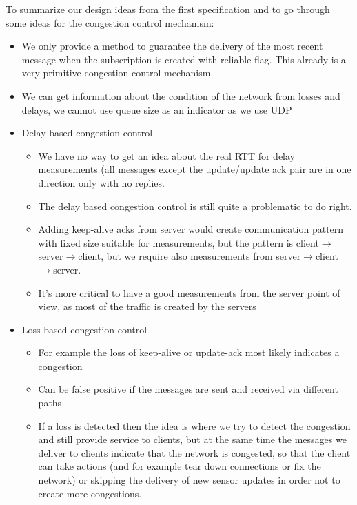 \documentclass[11pt,a4paper]{report}
\begin{document}
To summarize our design ideas from the first specification and to go through some ideas for the congestion control mechanism:
\begin{itemize}
 \item We only provide a method to guarantee the delivery of the most recent message when the subscription is created with reliable flag. This already is a very primitive congestion control mechanism.
 \item We can get information about the condition of the network from losses and delays, we cannot use queue size as an indicator as we use UDP
 \item Delay based congestion control
    \begin{itemize}
        \item We have no way to get an idea about the real RTT for delay measurements (all messages except the update/update ack pair are in one direction only with no replies.
         \item The delay based congestion control is still quite a problematic to do right. 
         \item Adding keep-alive acks from server would create communication pattern with fixed size suitable for measurements, but the pattern is client$\rightarrow$server$\rightarrow$client, but we require also measurements from server$\rightarrow$client$\rightarrow$server.
         \item It's more critical to have a good measurements from the server point of view, as most of the traffic is created by the servers
  \end{itemize}
\item Loss based congestion control
       \begin{itemize}
        \item For example the loss of keep-alive or update-ack most likely indicates a congestion
        \item Can be false positive if the messages are sent and received via different paths
        \item If a loss is detected then the idea is where we try to detect the congestion and still provide service to clients, but at the same time the messages we deliver to clients indicate that the network is congested, so that the client can take actions (and for example tear down connections or fix the network) or
skipping the delivery of new sensor updates in order not to create more congestions.
       \end{itemize}
\end{itemize}
\end{document}
